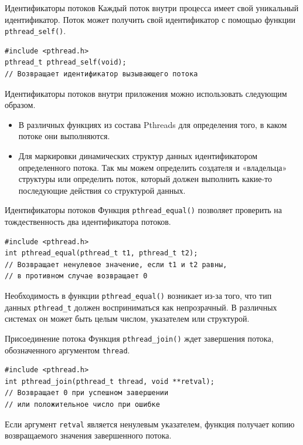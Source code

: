 \documentclass{beamer}
\begin{document}
\begin{frame}[fragile]{Идентификаторы потоков}
    Каждый поток внутри процесса имеет свой уникальный идентификатор. Поток может получить свой идентификатор с помощью функции \texttt{pthread_self()}.
    
\begin{verbatim}
#include <pthread.h>
pthread_t pthread_self(void);
// Возвращает идентификатор вызывающего потока
\end{verbatim}

    Идентификаторы потоков внутри приложения можно использовать следующим образом.
    \begin{itemize}
        \item В различных функциях из состава Pthreads для определения того, в каком потоке они выполняются.
        \item Для маркировки динамических структур данных идентификатором определенного потока. Так мы можем определить создателя и «владельца» структуры или определить поток, который должен выполнить какие-то последующие действия со структурой данных.
    \end{itemize}
\end{frame}

\begin{frame}[fragile]{Идентификаторы потоков}
    Функция \texttt{pthread\_equal()} позволяет проверить на тождественность два идентификатора потоков.
    
\begin{verbatim}
#include <pthread.h>
int pthread_equal(pthread_t t1, pthread_t t2);
// Возвращает ненулевое значение, если t1 и t2 равны,
// в противном случае возвращает 0
\end{verbatim}

    Необходимость в функции \texttt{pthread\_equal()} возникает из-за того, что тип данных \texttt{pthread\_t} должен восприниматься как непрозрачный. В различных системах он может быть целым числом, указателем или структурой.
\end{frame}

\begin{frame}[fragile]{Присоединение потока}
    Функция \texttt{pthread\_join()} ждет завершения потока, обозначенного аргументом \texttt{thread}.
    
\begin{verbatim}
#include <pthread.h>
int pthread_join(pthread_t thread, void **retval);
// Возвращает 0 при успешном завершении
// или положительное число при ошибке
\end{verbatim}

    Если аргумент \texttt{retval} является ненулевым указателем, функция получает копию возвращаемого значения завершенного потока. 
\end{frame}
\end{document}
